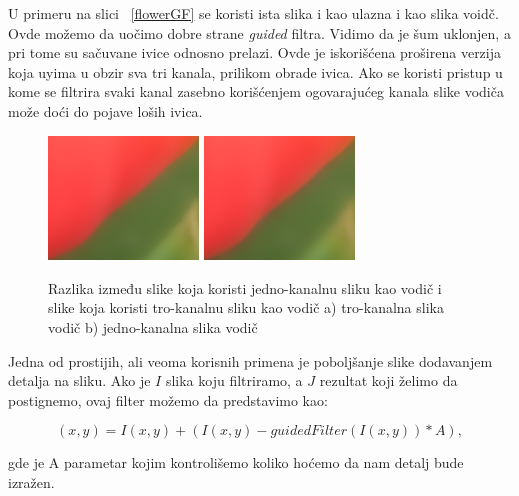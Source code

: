 \documentclass[a4paper,12pt,titlepage]{article}
\begin{document}
U primeru na slici ~\ref{flowerGF} se koristi ista slika i kao ulazna i kao slika voidč. Ovde možemo da uočimo dobre strane \emph{guided} filtra. Vidimo da je šum uklonjen, a pri tome su sačuvane ivice odnosno prelazi. Ovde je iskorišćena proširena verzija koja uyima u obzir sva tri kanala, prilikom obrade ivica. Ako se koristi pristup u kome se filtrira svaki kanal zasebno korišćenjem ogovarajućeg kanala slike vodiča može doći do pojave loših ivica. 

\begin{figure}[ht!]
\centering
\includegraphics[width=40mm]{img/zoom1.png}
\includegraphics[width=40mm]{img/zoom2.png}
\caption{Razlika između slike koja koristi jedno-kanalnu sliku kao vodič i slike koja koristi tro-kanalnu sliku kao vodič a) tro-kanalna slika vodič b) jedno-kanalna slika vodič }
\label{overflow}
\end{figure}

Jedna od prostijih, ali veoma korisnih primena je poboljšanje slike dodavanjem detalja na sliku. Ako je $I$ slika koju filtriramo, a $J$ rezultat koji želimo da postignemo, ovaj filter možemo da predstavimo kao:

\begin{equation}\label{eq:enh}
(x, y) = I(x, y) + (I(x, y) - guidedFilter(I(x, y)) * A),
\end{equation}

gde je A parametar kojim kontrolišemo koliko hoćemo da nam detalj bude izražen.
\end{document}
